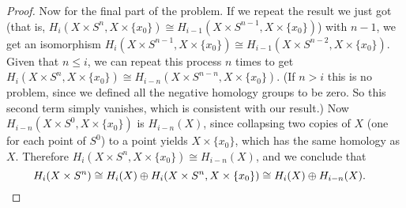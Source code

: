 \begin{proof}
Now for the final part of the problem. If we repeat the result we just got (that is, $H_i (X\times S^n , X\times \{x_0\} ) \cong H_{i-1}(X\times S^{n-1}, X\times \{x_0\} )$) with $n-1$, we get an isomorphism $H_i (X\times S^{n-1}, X\times \{x_0\} ) \cong H_{i-1}(X\times S^{n-2}, X\times \{x_0\} )$. Given that $n\leq i$, we can repeat this process $n$ times to get $H_i (X\times S^n , X\times \{x_0\} ) \cong H _{i-n}(X\times S^{n-n},X\times \{x_0\} )$. (If $n>i$ this is no problem, since we defined all the negative homology groups to be zero. So this second term simply vanishes, which is consistent with our result.) Now $H_{i-n}(X\times S^0, X\times \{x_0\} )$ is $H_{i-n}(X)$, since collapsing two copies of $X$ (one for each point of $S^0$) to a point yields $X\times \{x_0\} $, which has the same homology as $X$. Therefore $H_i (X\times S^n ,X\times \{x_0\} )\cong H_{i-n}(X)$, and we conclude that \[
    H_i (X\times S^n ) \cong H_i (X)\oplus H_i (X\times S^n , X\times \{x_0\} )\cong H_i (X)\oplus H_{i-n}(X).\quad \qedhere
\] \end{proof}
